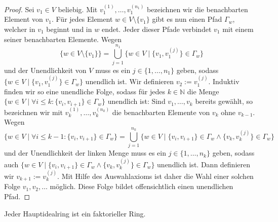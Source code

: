 \begin{proof}
    Sei $v_1\in V$ beliebig. Mit $v_1^{(1)},\ldots,v_1^{(n_1)}$ bezeichnen wir die benachbarten Element von $v_1$. Für jedes Element $w\in V\setminus\{v_1\}$ gibt es nun einen Pfad $\Gamma_w$, welcher in $v_1$ beginnt und in $w$ endet. Jeder dieser Pfade verbindet $v_1$ mit einem seiner benachbarten Elemente. Wegen
    $$\{w\in V\setminus\{v_1\}\}=\bigcup_{j=1}^{n_1}\{w\in V\mid \{v_1,v_1^{(j)}\}\in\Gamma_w\}$$ und der Unendlichkeit von $V$ muss es ein $j\in\{1,\ldots,n_1\}$ geben, sodass  $\{w\in V\mid \{v_1,v_1^{(j)}\}\in \Gamma_w\}$ unendlich ist. Wir definieren $v_2:=v_1^{(j)}$. Induktiv finden wir so eine unendliche Folge, sodass für jedes $k\in \mathbb{N}$ die Menge $\{w\in V\mid \forall i\leq k: \{v_i,v_{i+1}\}\in \Gamma_w\}$ unendlich ist: Sind $v_1,\ldots,v_k$ bereits gewählt, so bezeichnen wir mit $v_k^{(1)},\ldots,v_k^{(n_k)}$ die benachbarten Elemente von $v_k$ ohne $v_{k-1}$. Wegen $$\{w\in V\mid \forall i\leq k-1:\{v_i,v_{i+1}\}\in \Gamma_w\}=\bigcup_{j=1}^{n_k}\{w\in V\mid \{v_i,v_{i+1}\}\in \Gamma_w \land \{v_k,v_k^{(j)}\}\in \Gamma_w\}$$ und der Unendlichkeit der linken Menge muss es ein $j\in\{1,\ldots,n_k\}$ geben, sodass auch 
    $\{w\in V\mid \{v_i,v_{i+1}\}\in \Gamma_w \land \{v_k,v_k^{(j)}\}\in \Gamma_w\}$ unendlich ist. Dann definieren wir $v_{k+1}:=v_k^{(j)}$. Mit Hilfe des Auswahlaxioms ist daher die Wahl einer solchen Folge $v_1,v_2,\ldots$ möglich. Diese Folge bildet offensichtlich einen unendlichen Pfad.
\end{proof}

\begin{proposition}\label{prop:hir-ist-faktoriell}
    Jeder Hauptidealring ist ein faktorieller Ring.
\end{proposition}

